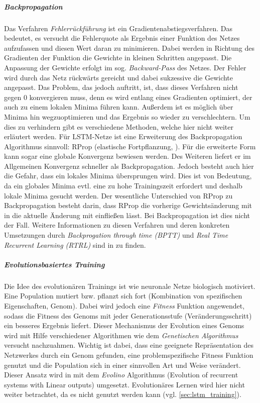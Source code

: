 \subparagraph{Backpropagation}
Das Verfahren \textit{Fehlerrückführung} ist ein Gradientenabstiegsverfahren.
Das bedeutet, es versucht die Fehlerquote als Ergebnis einer Funktion des Netzes
aufzufassen und diesen Wert daran zu minimieren. Dabei werden in Richtung des
Gradienten der Funktion die Gewichte in kleinen Schritten angepasst. Die
Anpassung der Gewichte erfolgt im sog.
\textit{Backward-Pass} des Netzes. Der Fehler wird durch das Netz rückwärts
gereicht und dabei sukzessive die Gewichte angepasst. Das Problem, das jedoch
auftritt, ist, dass dieses Verfahren nicht gegen 0 konvergieren muss, denn es
wird entlang eines Gradienten optimiert, der auch zu einem lokalen Minima führen
kann. Außerdem ist es möglich über Minima hin wegzuoptimieren und das Ergebnis
so wieder zu verschlechtern. Um dies zu verhindern gibt es verschiedene
Methoden, welche hier nicht weiter erläutert werden. Für \ac{LSTM}-Netze ist
eine Erweiterung des Backpropagation Algorithmus sinnvoll:
\acl{RProp} (elastische Fortpflanzung, ). Für die erweiterte Form
kann sogar eine globale Konvergenz bewiesen werden. Des Weiteren liefert er im
Allgemeinen Konvergenz schneller als Backpropagation. Jedoch besteht auch hier
die Gefahr, dass ein lokales Minima übersprungen wird. Dies ist von Bedeutung,
da ein globales Minima evtl. eine zu hohe Trainingszeit erfordert und deshalb
lokale Minima gesucht werden. Der wesentliche Unterschied von \ac{RProp} zu
Backpropagation besteht darin, dass \ac{RProp} die vorherige Gewichtsänderung
mit in die aktuelle Änderung mit einfließen lässt. Bei Backpropagation ist dies
nicht der Fall. Weitere Informationen zu diesen Verfahren und deren konkreten
Umsetzungen durch \textit{Backprogation through time (BPTT)} und \textit{Real
Time Recurrent Learning (RTRL)} sind in
\cite{RainerSchmoll2006,Gers2002b,GERS2001} zu finden.

\subparagraph{Evolutionsbasiertes Training}
Die Idee des evolutionären Trainings ist wie neuronale Netze biologisch
motiviert. Eine Population mutiert bzw. pflanzt sich fort (Kombination von
spezifischen Eigenschaften, Genom). Dabei wird jedoch eine \textit{Fitness}
Funktion angewendet, sodass die Fitness des Genoms mit jeder Generationsstufe
(Veränderungsschritt) ein besseres Ergebnis liefert. \cite{Marsland} Dieser
Mechanismus der Evolution eines Genoms wird mit Hilfe verschiedener Algorithmen
wie dem \textit{Genetischen Algorithmus} versucht nachzuahmen. Wichtig ist
dabei, dass eine geeignete Repräsentation des Netzwerkes durch ein Genom
gefunden, eine problemspezifische Fitness Funktion genutzt und die Population
sich in einer sinnvollen Art und Weise verändert. Dieser Ansatz wird in
\cite{Schmidhuber05evolino:hybrid} mit dem \textit{Evolino} Algorithmus
(Evolution of recurrent systems with Linear outputs) umgesetzt. Evolutionäres
Lernen wird hier nicht weiter betrachtet, da es nicht genutzt werden kann (vgl.
\autoref{sec:lstm_training}).



